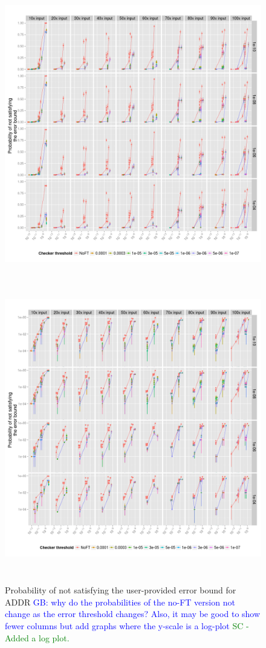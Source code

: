 \documentclass{sig-alternate}
\newcommand{\sui}[1]{%
  \textcolor{green}{SC - #1}
}
\newcommand{\greg}[1]{%
  \textcolor{blue}{GB: #1}
}
\begin{document}
\begin{figure}[ht!]
\centering
\includegraphics[height=5in]{figs/Lasso_ImperfectRate.png}
\includegraphics[height=5in]{figs/Lasso_ImperfectRate_log.png}
\caption{Probability of not satisfying the user-provided error bound for ADDR \greg{why do the probabilities of the no-FT version not change as the error threshold changes? Also, it may be good to show fewer columns but add graphs where the y-scale is a log-plot} \sui{Added a log plot.}}
\label{fig:Lasso_ImperfectRate}
\end{figure}
\end{document}
